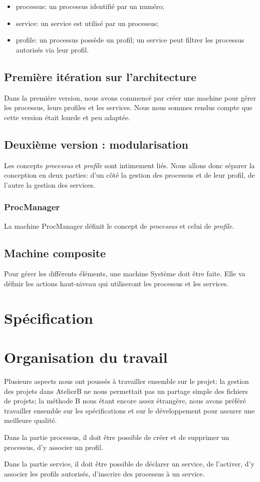 \documentclass[french, 11pt, a4paper]{article}
\begin{document}
\begin{itemize}
  \item processus: un processus identifié par un numéro;
  \item service: un service est utilisé par un processus;
  \item profile: un processus possède un profil; un service peut filtrer les
    processus autorisés via leur profil.
\end{itemize}

\subsection{Première itération sur l'architecture}
    Dans la première version, nous avons commencé par créer une machine pour
    gérer les processus, leurs profiles et les services. Nous nous sommes rendus
    compte que cette version était lourde et peu adaptée.

\subsection{Deuxième version : modularisation}
Les concepts \emph{processus} et \emph{profile} sont intimement liés. Nous
allons donc séparer la conception en deux parties: d'un côté la gestion des
processus et de leur profil, de l'autre la gestion des services.


    \subsubsection{ProcManager}
        La machine ProcManager définit le concept de \emph{processus} et celui de \emph{profile}.

\subsection{Machine composite}

        Pour gérer les différents éléments, une machine Système doit être faite.
        Elle va définir les actions haut-niveau qui utiliseront les processus et
        les services.


\section{Spécification}



\section{Organisation du travail}
    Plusieurs aspects nous ont poussés à travailler ensemble sur le projet: la
    gestion des projets dans AtelierB ne nous permettait pas un partage simple
    des fichiers de projets; la méthode B nous étant encore assez étrangère,
    nous avons préféré travailler ensemble sur les spécifications et sur le
    développement pour assurer une meilleure qualité.


Dans la partie processus, il doit être possible de créer et de supprimer un
processus, d'y associer un profil.

Dans la partie service, il doit être possible de déclarer un service, de
l'activer, d'y associer les profils autorisés, d'inscrire des processus à un
service.
\end{document}

